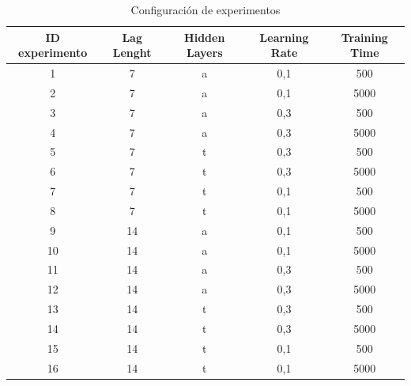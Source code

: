 \documentclass[12pt,a4paper, xcolor=table]{article}
\begin{document}
    \begin{table}[h]
    \begin{tabular}{|c|c|c|c|c|}
    \hline
    \rowcolor[HTML]{DAE8FC}
    \textbf{ID experimento} & \textbf{Lag Lenght} & \textbf{Hidden Layers} & \textbf{Learning Rate} & \textbf{Training Time} \\ \hline
    1                       & 7                   & a                      & 0,1                    & 500                    \\ \hline
    2                       & 7                   & a                      & 0,1                    & 5000                   \\ \hline
    3                       & 7                   & a                      & 0,3                    & 500                    \\ \hline
    4                       & 7                   & a                      & 0,3                    & 5000                   \\ \hline
    5                       & 7                   & t                      & 0,3                    & 500                    \\ \hline
    6                       & 7                   & t                      & 0,3                    & 5000                   \\ \hline
    7                       & 7                   & t                      & 0,1                    & 500                    \\ \hline
    8                       & 7                   & t                      & 0,1                    & 5000                   \\ \hline
    9                       & 14                  & a                      & 0,1                    & 500                    \\ \hline
    10                      & 14                  & a                      & 0,1                    & 5000                   \\ \hline
    11                      & 14                  & a                      & 0,3                    & 500                    \\ \hline
    12                      & 14                  & a                      & 0,3                    & 5000                   \\ \hline
    13                      & 14                  & t                      & 0,3                    & 500                    \\ \hline
    14                      & 14                  & t                      & 0,3                    & 5000                   \\ \hline
    15                      & 14                  & t                      & 0,1                    & 500                    \\ \hline
    16                      & 14                  & t                      & 0,1                    & 5000                   \\ \hline
    \end{tabular}
    \caption{Configuración de experimentos}
    \end{table}
\end{document}
